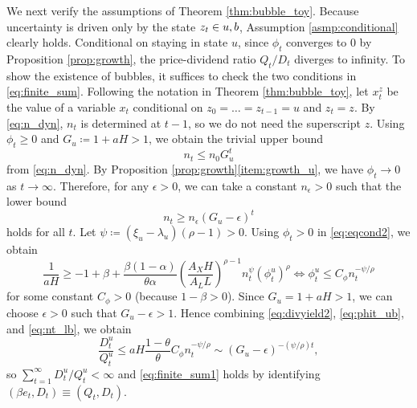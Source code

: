 \documentclass[a4paper,12pt]{article}
\numberwithin{equation}{section}
\theoremstyle{plain}
\begin{document}
We next verify the assumptions of Theorem \ref{thm:bubble_toy}. Because uncertainty is driven only by the state $z_t\in \set{u,b}$, Assumption \ref{asmp:conditional} clearly holds. Conditional on staying in state $u$, since $\phi_t$ converges to 0 by Proposition \ref{prop:growth}, the price-dividend ratio $Q_t/D_t$ diverges to infinity. To show the existence of bubbles, it suffices to check the two conditions in \eqref{eq:finite_sum}. Following the notation in Theorem \ref{thm:bubble_toy}, let $x_t^z$ be the value of a variable $x_t$ conditional on $z_0=\dots=z_{t-1}=u$ and $z_t=z$. By \eqref{eq:n_dyn}, $n_t$ is determined at $t-1$, so we do not need the superscript $z$. Using $\phi_t\ge 0$ and $G_u\coloneqq 1+aH>1$, we obtain the trivial upper bound
\begin{equation}
    n_t\le n_0G_u^t \label{eq:nt_ub}
\end{equation}
from \eqref{eq:n_dyn}. By Proposition \ref{prop:growth}\ref{item:growth_u}, we have $\phi_t\to 0$ as $t\to\infty$. Therefore, for any $\epsilon>0$, we can take a constant $n_\epsilon>0$ such that the lower bound
\begin{equation}
    n_t \ge n_\epsilon (G_u-\epsilon)^t \label{eq:nt_lb}
\end{equation}
holds for all $t$. Let $\psi\coloneqq (\xi_u-\lambda_u)(\rho-1)>0$. Using $\phi_t>0$ in \eqref{eq:eqcond2}, we obtain
\begin{equation}
    \frac{1}{aH}\ge -1+\beta+\frac{\beta(1-\alpha)}{\theta\alpha}\left(\frac{A_XH}{A_LL}\right)^{\rho-1}n_t^\psi(\phi_t^u)^\rho \iff \phi_t^u\le C_\phi n_t^{-\psi/\rho} \label{eq:phit_ub}
\end{equation}
for some constant $C_\phi>0$ (because $1-\beta>0$). Since $G_u=1+aH>1$, we can choose $\epsilon>0$ such that $G_u-\epsilon>1$. Hence combining \eqref{eq:divyield2}, \eqref{eq:phit_ub}, and \eqref{eq:nt_lb}, we obtain
\begin{equation*}
    \frac{D_t^u}{Q_t^u}\le aH\frac{1-\theta}{\theta}C_\phi n_t^{-\psi/\rho}\sim (G_u-\epsilon)^{-(\psi/\rho)t},
\end{equation*}
so $\sum_{t=1}^\infty D_t^u/Q_t^u<\infty$ and \eqref{eq:finite_sum1} holds by identifying $(\beta e_t,D_t)\equiv (Q_t,D_t)$.
\end{document}
